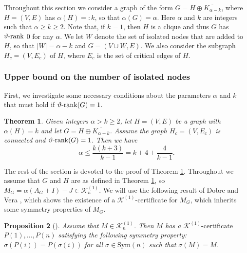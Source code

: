 \documentclass[11pt]{article}
\newtheorem{theorem}{Theorem}[section]
\newtheorem{proposition}[theorem]{Proposition}
\newcommand{\konec}{\MK^{(1)}\text{-certificate}}
\numberwithin{equation}{section}
\newcommand{\MK}{{\mathcal K}}
\newcommand{\rrank}{\vartheta\text{\rm -rank}}
\begin{document}
Throughout this section we  consider  a graph of the form $G=H\oplus \overline{K_{\alpha-k}}$, where $H=(V,E)$ has  $\alpha(H)=:k$, so that $\alpha(G)=\alpha$.  Here $\alpha$ and $k$ are integers such that $\alpha\ge k\ge 2$. Note that, if $k=1$, then $H$ is a clique and thus $G$ has $\rrank$ 0 for any $\alpha$. We let $W$ denote the set of  isolated nodes that are added to $H$, so that $|W|=\alpha-k$ and $G=(V\cup W, E)$. We also consider  the subgraph $H_c=(V,E_c)$ of $H$, where $E_c$ is the set of critical edges of $H$. 

\subsubsection{Upper bound on the number of isolated nodes}
 First, we investigate some necessary conditions about the parameters $\alpha$ and $k$ that must hold if $\rrank(G)= 1$. 


\begin{theorem}\label{theo-ineq}
Given integers $\alpha>k\ge 2$, let $H=(V,E)$ be a graph  with $\alpha(H)=k$ and let $G=H\oplus \overline{K_{\alpha-k}}$. Assume the graph $H_c=(V,E_c)$ is connected and  $\rrank(G)=1$. Then 
we have
\begin{equation}\label{ineq}
    \alpha \leq \frac{k(k+3)}{k-1} = k + 4+\frac{4}{k-1}.
\end{equation}

\end{theorem}

The rest of the section is devoted to the proof of Theorem \ref{theo-ineq}.
Throughout we assume that $G$ and $H$ are as defined in Theorem \ref{theo-ineq}, so $M_G=\alpha(A_G+I)-J\in \mathcal{K}_n^{(1)}$. 
We will use the following result of  Dobre and Vera \cite{DV}, which shows  the existence of a  $\konec$ for $M_G$, which inherits some  symmetry properties of $M_G$.
 
\begin{proposition}[\cite{DV}]\label{k_1_sym}
Assume that $M\in \mathcal{K}_n^{(1)}$.   Then $M$ has a $\konec$ $P(1),\dots,P(n)$ satisfying the following symmetry property: $\sigma(P(i))=P(\sigma(i))$ for all $\sigma\in \text{Sym}(n)$ such that  $\sigma(M)=M$.
\end{proposition}
\end{document}
